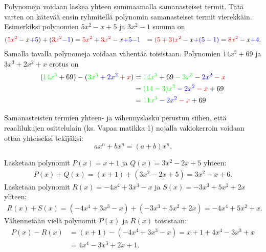 
Polynomeja voidaan laskea yhteen summaamalla samanasteiset termit. Tätä varten on kätevää ensin ryhmitellä polynomin samanasteiset termit vierekkäin. Esimerkiksi polynomien $5x^2-x+5$ ja $3x^2-1$ summa on
   \begin{align*}
        (\textcolor{red}{5x^2}-x\textcolor{blue}{+5})+(\textcolor{red}{3x^2}\textcolor{blue}{-1}) &=\textcolor{red}{5x^2}+\textcolor{red}{3x^2}-x\textcolor{blue}{+5}\textcolor{blue}{-1} &=\textcolor{red}{(5+3)x^2}-x\textcolor{blue}{+(5-1)}=\textcolor{red}{8x^2}-x\textcolor{blue}{+4}.
    \end{align*}
Samalla tavalla polynomeja voidaan vähentää toisistaan. Polynomien
$14x^3+69$ ja $3x^3+2x^2+x$ erotus on
    \begin{align*}
        (\textcolor{green}{14x^3} + 69) - (\textcolor{green}{3x^3} \textcolor{blue}{{}+ 2x^2} \textcolor{red}{{}+x})
        &= \textcolor{green}{14x^3} + 69 \textcolor{green}{{}-3x^3} - 
            \textcolor{blue}{2x^2} \textcolor{red}{{}-x} \\
        &= \textcolor{green}{(14-3)x^3} \textcolor{blue}{{}-2x^2} \textcolor{red}{{}-x} + 69 \\
        &= \textcolor{green}{11x^3} \textcolor{blue}{{}-2x^2} \textcolor{red}{{}-x} + 69
    \end{align*}
    
Samanasteisten termien yhteen- ja vähennyslasku perustuu siihen, että reaalilukujen osittelulain (ks. Vapaa matikka 1) nojalla vakiokerroin voidaan
ottaa yhteiseksi tekijäksi:
\[
ax^n+bx^n=(a+b)x^n.
\]
    
\begin{esimerkki}
Lasketaan polynomit
$P(x)=x+1$ ja $Q(x)=3x^2-2x+5$ yhteen:
   \begin{align*}
        P(x)+Q(x)=(x+1)+(3x^2-2x+5) =3x^2-x+6.
    \end{align*}
Lasketaan polynomit $R(x)=-4x^4+3x^3-x$ ja $S(x)=-3x^3+5x^2+2x$ yhteen:
   \begin{align*}
        R(x)+S(x)=(-4x^4+3x^3-x)+(-3x^3+5x^2+2x) =-4x^4+5x^2+x.
    \end{align*}
Vähennetään vielä polynomit $P(x)$ ja $R(x)$ toisistaan:
   \begin{align*}
        P(x)-R(x) & =(x+1)-(-4x^4+3x^3-x) =x+1+4x^4-3x^3+x \\
        & =4x^4-3x^3+2x+1.
    \end{align*}
\end{esimerkki}

